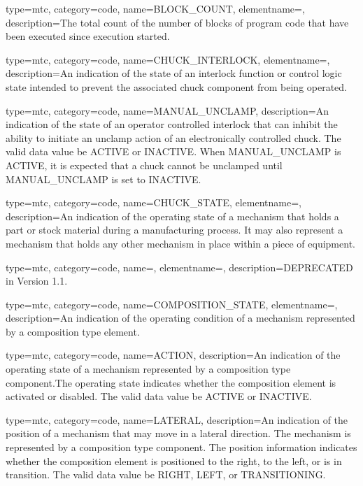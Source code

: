 {
  type=mtc,
  category=code,
  name={BLOCK\_COUNT},
  elementname=,
  description={The total count of the number of blocks of program code that have been executed since execution started.}
}

{
  type=mtc,
  category=code,
  name={CHUCK\_INTERLOCK},
  elementname=,
  description={An indication of the state of an interlock function or control logic state intended to prevent the associated \gls{chuck} component from being operated.}
}

{
  type=mtc,
  category=code,
  name={MANUAL\_UNCLAMP},
  description={An indication of the state of an operator controlled interlock that can inhibit the ability to initiate an unclamp action of an electronically controlled chuck.  The \gls{valid data value} \must be ACTIVE or INACTIVE. \newline When MANUAL\_UNCLAMP is ACTIVE, it is expected that a chuck cannot be unclamped until MANUAL\_UNCLAMP is set to INACTIVE. }
}

{
  type=mtc,
  category=code,
  name={CHUCK\_STATE},
  elementname=,
  description={An indication of the operating state of a mechanism that holds a part or stock material during a manufacturing process. It may also represent a mechanism that holds any other mechanism in place within a piece of equipment.}
}

{
  type=mtc,
  category=code,
  name=,
  elementname=,
  description={DEPRECATED in Version 1.1.}
}

{
  type=mtc,
  category=code,
  name={COMPOSITION\_STATE},
  elementname=,
  description={An indication of the operating condition of a mechanism represented by a \gls{composition} type element.}
}

{
  type=mtc,
  category=code,
  name={ACTION},
  description={An indication of the operating state of a mechanism represented by a \gls{composition} type component.The operating state indicates whether the \gls{composition} element is activated or disabled. The \gls{valid data value} \must be ACTIVE or INACTIVE.}
}

{
  type=mtc,
  category=code,
  name={LATERAL},
  description={An indication of the position of a mechanism that may move in a lateral direction.   The mechanism is represented by a \gls{composition} type component. \newline The position information indicates whether the \gls{composition} element is positioned to the right, to the left, or is in transition.  \newline The \gls{valid data value} \must be RIGHT, LEFT, or TRANSITIONING.}
}

